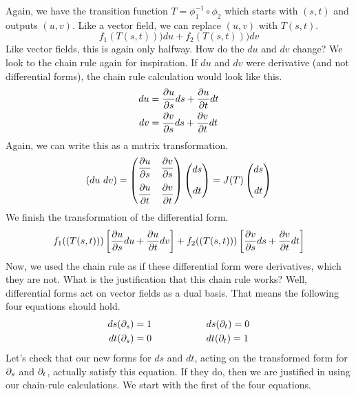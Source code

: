 \documentclass[fleqn,letterpaper]{report}
\begin{document}
Again, we have the transition function $T = \phi_1^{-1} \circ
\phi_2$ which starts with $(s,t)$ and outputs $(u,v)$. Like a
vector field, we can replace $(u,v)$ with $T(s,t)$. 
\begin{equation*}
f_1(T(s,t))) du + f_2(T(s,t))) dv 
\end{equation*}
Like vector fields, this is again only halfway. How do the
$du$ and $dv$ change? We look to the chain rule again for
inspiration. If $du$ and $dv$ were derivative (and not
differential forms), the chain rule calculation would look
like this. 
\begin{align*}
du & = \frac{\partial u}{\partial s} ds + 
\frac{\partial u}{\partial t} dt \\
dv & = \frac{\partial v}{\partial s} ds + 
\frac{\partial v}{\partial t} dt 
\end{align*}
Again, we can write this as a matrix transformation. 
\begin{equation*}
\left( du \ dv \right) =
\left( \begin{matrix} 
\dfrac{\partial u}{\partial s} & 
\dfrac{\partial v}{\partial s} \\[1em]
\dfrac{\partial u}{\partial t} & 
\dfrac{\partial v}{\partial t} 
\end{matrix} \right) 
\left( \begin{matrix} ds \\[1em] 
dt \end{matrix} \right) = J(T) 
\left( \begin{matrix} ds \\[1em] 
dt \end{matrix} \right) 
\end{equation*}
We finish the transformation of the differential form. 
\begin{equation*}
f_1((T(s,t))) \left[ 
\frac{\partial u}{\partial s} du + 
\frac{\partial u}{\partial t} dv \right] + 
f_2((T(s,t))) \left[ 
\frac{\partial v}{\partial s} ds + 
\frac{\partial v}{\partial t} dt \right]
\end{equation*}
Now, we used the chain rule as if these differential form were
derivatives, which they are not. What is the justification
that this chain rule works? Well, differential forms act on
vector fields as a dual basis. That means the following four
equations should hold.
\begin{align*}
ds(\partial_s) & = 1 \hspace{2cm} ds(\partial_t) = 0 \\
dt(\partial_s) & = 0 \hspace{2cm} dt(\partial_t) = 1 
\end{align*}
Let's check that our new forms for $ds$ and $dt$, acting on
the transformed form for $\partial_s$ and $\partial_t$, actually
satisfy this equation. If they do, then we are justified in
using our chain-rule calculations. We start with the first of
the four equations.
\end{document}
